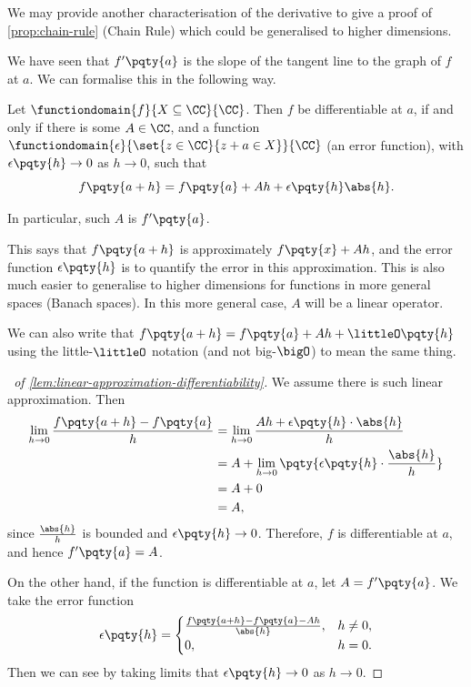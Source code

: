 We may provide another characterisation of the derivative to give a proof of \autoref{prop:chain-rule} (Chain Rule) which could be generalised to higher dimensions.

We have seen that \(f'\pqty{a}\) is the slope of the tangent line to the graph of \(f\) at \(a\). We can formalise this in the following way.

\begin{lemma}
    \label{lem:linear-approximation-differentiability}%
    Let \(\functiondomain{f}{X \subseteq \CC}{\CC}\). Then \(f\) be differentiable at \(a\), if and only if there is some \(A \in \CC\), and a function \(\functiondomain{\epsilon}{\set{z \in \CC}{z + a \in X}}{\CC}\) (an error function), with \(\epsilon\pqty{h} \to 0\) as \(h \to 0\), such that
    \[
        f\pqty{a + h} = f\pqty{a} + A h + \epsilon\pqty{h} \abs{h}.
    \]

    In particular, such \(A\) is \(f'\pqty{a}\).
\end{lemma}

\begin{remark}
    This says that \(f\pqty{a + h}\) is approximately \(f\pqty{x} + Ah\), and the error function \(\epsilon\pqty{h}\) is to quantify the error in this approximation. This is also much easier to generalise to higher dimensions for functions in more general spaces (Banach spaces). In this more general case, \(A\) will be a linear operator.
\end{remark}

We can also write that \(f\pqty{a + h} = f\pqty{a} + Ah + \littleO\pqty{h}\) using the little-\(\littleO\) notation (and not big-\(\bigO\)) to mean the same thing.

\begin{proof}[\proofname\ of \autoref{lem:linear-approximation-differentiability}]
    We assume there is such linear approximation. Then
    \begin{align*}
        \lim_{h \to 0} \frac{f\pqty{a + h} - f\pqty{a}}{h} &= \lim_{h \to 0} \frac{Ah + \epsilon\pqty{h} \cdot \abs{h}}{h} \\
        &= A + \lim_{h \to 0} \pqty{\epsilon\pqty{h} \cdot \frac{\abs{h}}{h}} \\
        &= A + 0 \\
        &= A,
    \end{align*}
    since \(\frac{\abs{h}}{h}\) is bounded and \(\epsilon\pqty{h} \to 0\). Therefore, \(f\) is differentiable at \(a\), and hence \(f'\pqty{a} = A\).

    On the other hand, if the function is differentiable at \(a\), let \(A = f'\pqty{a}\). We take the error function
    \[
        \epsilon\pqty{h} = \begin{cases}
            \frac{f\pqty{a + h} - f\pqty{a} - Ah}{\abs{h}}, & h \neq 0, \\
            0, & h = 0.
        \end{cases}
    \]
    Then we can see by taking limits that \(\epsilon\pqty{h} \to 0\) as \(h \to 0\).
\end{proof}

